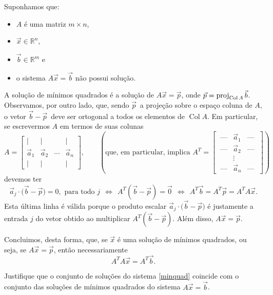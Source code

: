 Suponhamos que:
\begin{itemize}
\item $A$ é uma matriz $m \times n$,
\item $\vec{x} \in \mathbb{R}^n$,
\item $\vec{b} \in \mathbb{R}^m$ e
\item o sistema $A \vec{x} = \vec{b}$ não possui solução.
\end{itemize} A solução de mínimos quadrados é a solução de $A \vec{x} = \vec{p}$, onde $\vec{p} = \operatorname{proj}_{\operatorname{Col} A} \vec{b}$. Observamos, por outro lado, que, sendo $\vec{p}\,$ a projeção sobre o espaço coluna de $A$, o vetor $\vec{b} - \vec{p}\,$ deve ser ortogonal a todos os elementos de $\operatorname{Col} A$. Em particular, se escrevermos $A$ em termos de suas colunas
\begin{equation}
A =
\begin{bmatrix}
  | & | &   & | \\
  \vec{a}_1 & \vec{a}_2 & \cdots  & \vec{a}_n \\
  | & | &   & |
\end{bmatrix}, \qquad \left( \text{que,  em particular, implica }
  A^T = \begin{bmatrix}
    \ \text{---} & \vec{a}_1  & \text{---} \ \\
    \ \text{---} & \vec{a}_2  & \text{---} \ \\
    \ & \vdots     &  \ \\
    \ \text{---} & \vec{a}_n  & \text{---}\ 
  \end{bmatrix}\right)
\end{equation} devemos ter
\begin{equation}
\vec{a}_j \cdot \big(\vec{b} - \vec{p}\big) = 0, \text{ para todo } j  \ \  \iff \ \
A^T (\vec{b} - \vec{p}) = \vec{0} \ \ \iff \ \ A^T \vec{b} = A^T \vec{p} = A^T A\vec{x}.
\end{equation} Esta última linha é válida porque o produto escalar $\vec{a}_j \cdot \big(\vec{b} - \vec{p}\big)$ é justamente a entrada $j$ do vetor obtido ao multiplicar $A^T(\vec{b} - \vec{p})$. Além disso, $A \vec{x} = \vec{p}.$

Concluimos, desta forma, que, se $\vec{x}$ é uma solução de mínimos quadrados, ou seja, se $A \vec{x} = \vec{p}$, então necessariamente
\begin{equation}\label{minquad}
  \boxed{A^T A\vec{x} = A^T \vec{b}.}
\end{equation}

 \begin{exer}%
  Justifique que o conjunto de soluções do sistema \eqref{minquad} coincide com o conjunto das soluções de mínimos quadrados do sistema $A \vec{x} = \vec{b}$.
\end{exer}

